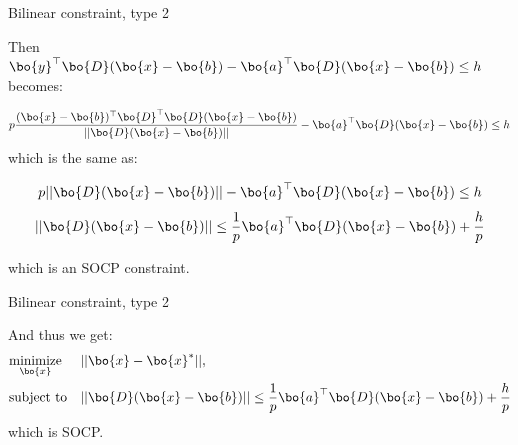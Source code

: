 \documentclass{beamer}
\begin{document}
\begin{frame}{Bilinear constraint, type 2}
\begin{flushleft}

Then $\bo{y}^\top \bo{D} (\bo{x} - \bo{b}) - \bo{a}^\top \bo{D} (\bo{x} - \bo{b}) \leq h$ becomes:

\begin{equation}
    p \frac{ (\bo{x} - \bo{b})^\top \bo{D}^\top \bo{D} (\bo{x} - \bo{b}) }{|| \bo{D} (\bo{x} - \bo{b}) ||}  - \bo{a}^\top \bo{D} (\bo{x} - \bo{b}) \leq h
\end{equation}
%
which is the same as:

\begin{equation}
    p || \bo{D} (\bo{x} - \bo{b}) || - \bo{a}^\top \bo{D} (\bo{x} - \bo{b}) \leq h
\end{equation}
\begin{equation}
    || \bo{D} (\bo{x} - \bo{b}) ||  \leq \frac{1}{p}\bo{a}^\top \bo{D} (\bo{x} - \bo{b}) + \frac{h}{p}
\end{equation}

which is an SOCP constraint.
 
\end{flushleft}
\end{frame}



\begin{frame}{Bilinear constraint, type 2}
\begin{flushleft}

And thus we get:
%
\begin{equation}
\begin{aligned}
& \underset{\bo{x}}{\text{minimize}}
& & ||\bo{x} - \bo{x}^*||, \\
& \text{subject to}
& & || \bo{D} (\bo{x} - \bo{b}) ||  \leq \frac{1}{p}\bo{a}^\top \bo{D} (\bo{x} - \bo{b}) + \frac{h}{p}
\end{aligned}
\end{equation}
%
which is SOCP. 
 
\end{flushleft}
\end{frame}
\end{document}
